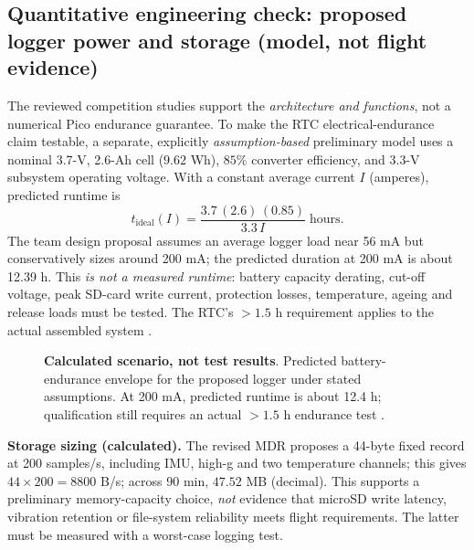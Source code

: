 \documentclass[10pt,a4paper]{article}
\begin{document}
\subsection{Quantitative engineering check: proposed logger power and storage (model, not flight evidence)}
The reviewed competition studies support the \emph{architecture and functions}, not a numerical Pico endurance guarantee. To make the RTC electrical-endurance claim testable, a separate, explicitly \emph{assumption-based} preliminary model uses a nominal 3.7-V, 2.6-Ah cell ($9.62$ Wh), $85\%$ converter efficiency, and $3.3$-V subsystem operating voltage. With a constant average current $I$ (amperes), predicted runtime is
\[
 t_{\mathrm{ideal}}(I)=\frac{3.7\,(2.6)\,(0.85)}{3.3\,I}\;\mathrm{hours}.
\]
The team design proposal assumes an average logger load near 56 mA but conservatively sizes around 200 mA; the predicted duration at 200 mA is about 12.39 h. This \emph{is not a measured runtime}: battery capacity derating, cut-off voltage, peak SD-card write current, protection losses, temperature, ageing and release loads must be tested. The RTC's $>1.5$ h requirement applies to the actual assembled system \cite{rtc2027rules,rpicopico}.

\begin{figure}[htbp]\centering
{}
\caption{\textbf{Calculated scenario, not test results}. Predicted battery-endurance envelope for the proposed logger under stated assumptions. At 200 mA, predicted runtime is about 12.4 h; qualification still requires an actual $>1.5$ h endurance test \cite{rtc2027rules,rpicopico}.}
\label{fig:power}
\end{figure}

\textbf{Storage sizing (calculated).} The revised MDR proposes a 44-byte fixed record at 200 samples/s, including IMU, high-g and two temperature channels; this gives $44\times200=8800$ B/s; across 90 min, $47.52$ MB (decimal). This supports a preliminary memory-capacity choice, \emph{not} evidence that microSD write latency, vibration retention or file-system reliability meets flight requirements. The latter must be measured with a worst-case logging test.
\end{document}
